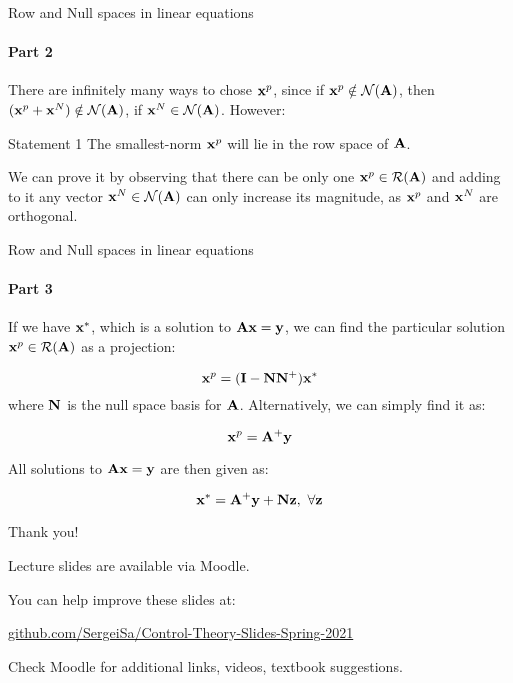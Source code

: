 \documentclass{beamer}
\begin{document}
\begin{frame}{Row and Null spaces in linear equations}
\framesubtitle{Part 2}
\begin{flushleft}

There are infinitely many ways to chose $\mathbf{x}^p$, since if $\mathbf{x}^p \notin \mathcal{N}(\mathbf{A})$, then $(\mathbf{x}^p + \mathbf{x}^N) \notin \mathcal{N}(\mathbf{A})$, if $\mathbf{x}^N \in \mathcal{N}(\mathbf{A})$. However: 

\begin{block}{Statement 1}
The smallest-norm $\mathbf{x}^p$ will lie in the row space of $\mathbf{A}$.
\end{block}

\bigskip

We can prove it by observing that there can be only one $\mathbf{x}^p \in \mathcal{R}(\mathbf{A})$ and adding to it any vector $\mathbf{x}^N \in \mathcal{N}(\mathbf{A})$ can only increase its magnitude, as $\mathbf{x}^p$ and $\mathbf{x}^N$ are orthogonal.

\end{flushleft}
\end{frame}



\begin{frame}{Row and Null spaces in linear equations}
\framesubtitle{Part 3}
\begin{flushleft}

If we have $\mathbf{x}^*$, which is a solution to $\mathbf{A} \mathbf{x} = \mathbf{y}$, we can find the particular solution $\mathbf{x}^p \in \mathcal{R}(\mathbf{A})$ as a projection:

\begin{equation}
    \mathbf{x}^p = (\mathbf{I} - \mathbf{N} \mathbf{N}^+) \mathbf{x}^*
\end{equation}
%
where $\mathbf{N}$ is the null space basis for $\mathbf{A}$. Alternatively, we can simply find it as:

\begin{equation}
    \mathbf{x}^p = \mathbf{A}^+ \mathbf{y}
\end{equation}

\bigskip

All solutions to $\mathbf{A} \mathbf{x} = \mathbf{y}$ are then given as:

\begin{equation}
    \mathbf{x}^* = \mathbf{A}^+ \mathbf{y} + \mathbf{N}\mathbf{z}, \ \forall \mathbf{z}
\end{equation}

\end{flushleft}
\end{frame}




\begin{frame}{Thank you!}
\centerline{Lecture slides are available via Moodle.}
\bigskip
\centerline{You can help improve these slides at:}
\centerline{\href{https://github.com/SergeiSa/Control-Theory-Slides-Spring-2021}{github.com/SergeiSa/Control-Theory-Slides-Spring-2021}}
\bigskip
\centerline{Check Moodle for additional links, videos, textbook suggestions.}
\end{frame}
\end{document}

